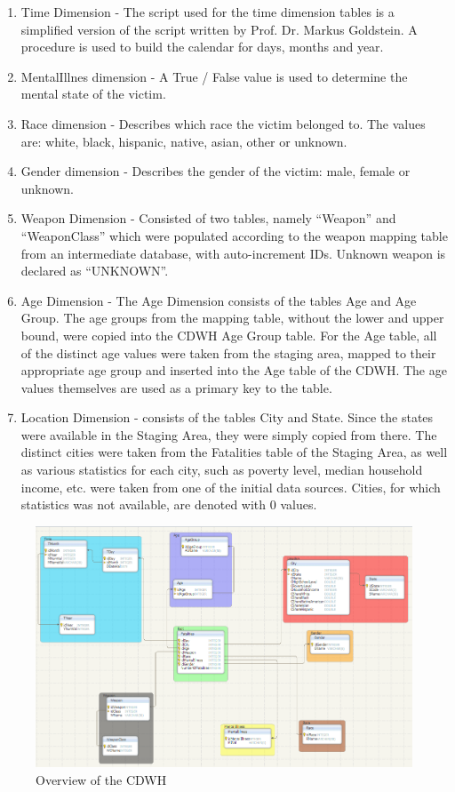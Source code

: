 \documentclass[11pt, journal]{IEEEtran}
\begin{document}
\begin{enumerate}
	\item Time Dimension - The script used for the time dimension tables is a simplified version of the script written by Prof. Dr. Markus Goldstein. A procedure is used to build the calendar for days, months and year.
	\item MentalIllnes dimension - A True / False value is used to determine the mental state of the victim.
	\item Race dimension - Describes which race the victim belonged to. The values are: white, black, hispanic, native, asian, other or unknown.
	\item Gender dimension - Describes the gender of the victim: male, female or unknown.
	\item Weapon Dimension - Consisted of two tables, namely “Weapon” and “WeaponClass” which were populated according to the weapon mapping table from an intermediate database, with auto-increment IDs. Unknown weapon is declared as “UNKNOWN”.
	\item Age Dimension - The Age Dimension consists of the tables Age and Age Group. The age groups from the mapping table, without the lower and upper bound, were copied into the CDWH Age Group table. For the Age table, all of the distinct age values were taken from 			the staging area, mapped to their appropriate age group and inserted into the Age table of the CDWH. The age values themselves are used as a primary key to the table.
	\item Location Dimension - consists of the tables City and State. Since the states were available in the Staging Area, they were simply copied from there. The distinct cities were taken from the Fatalities table of the Staging Area, as well as various statistics for each city, such as poverty level, median household income, etc. were taken from one of the initial data sources. Cities, for which statistics was not available, are denoted with 0 values.

\end{enumerate}

\begin{figure}[htb]
	\centering
		\includegraphics[width=1.0\columnwidth]{images/snapshot2}
	\caption{Overview of the CDWH}
	\label{fig:probov2}
\end{figure}
%
\end{document}
